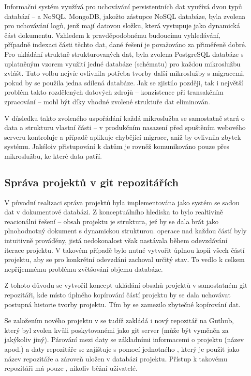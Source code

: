 Informační systém využívá pro uchovávání persistentních dat využívá dvou typů databází –  a NoSQL\@.
MongoDB, jakožto zástupce NoSQL databáze, byla zvolena pro uchovávání logů, jenž mají datovou složku, která vystupuje jako dynamická část dokumentu.
Vzhledem k pravděpodobnému budoucímu vyhledávání, případně indexaci části těchto dat, dané řešení je považováno za přiměřeně dobré.
Pro ukládání struktně strukturovaných dat, byla zvolena PostgreSQL databáze s uplatněným vzorem využití jedné databáze (schématu) pro každou mikroslužbu zvlášt.
Tuto volbu nejvíc ovlivnila potřeba tvorby další mikroslužby s migracemi, pokud by se použila jedna sdílená databáze.
Jak se zjistilo později, tak i největší problém takto rozdělených datových zdrojů – konzistence při transakčním zpracování – mohl být díky vhodné zvolené struktuře dat eliminován.

V důsledku takto zvoleného uspořádání každá mikroslužba se samostatně stará o data a strukturu vlastní části – v produkčním nasazení před spuštěním webového serveru kontroluje a případě aplikuje chybějící migrace, aniž by ovlivnila zbytek systému.
Jakéloiv přistupování k datům je rovněž komunikováno pouze přes mikroslužbu, ke které data patří.



\subsection{Správa projektů v git repozitářích}\label{subsec:server-db-github}

V původní realizaci  správa projektů byla implementována jako systém se sadou dat v dokumentové databázi.
Z konceptuálního hlediska to bylo realtivině reacionální řešení – obsah projektu je  struktura, jež by se dala brát jako plnohodnotný dokument s dynamickou strukturou.
 operace nad každou částí byly intuitivně prováděny, jistá nedokonalost však nastávala během odevzdávání iterace projektu.
V takovém případě bylo nutné vytvořit úplnou kopii všech částí projektu, aby se pro konkrétní odevzdání zachoval určitý stav.
To vedlo k celkem nepříjemnému problému zvětšování objemu databáze.

Z tohoto důvodu se vytvořil koncept ukládání obsahů projektů v samostatném git repozitáři, kde místo úplného kopírování částí projektu by se dala uchovávat postupná historie tvorby projektu.
Tím by se zamezilo zbytečné kopírování dat.

Se založením nového projektu v  se tudíž zakládá i nový repozitář na Guthub, který byl zvolen kvůli poskytovanémi  jako git server (může být vyměněn za jakýkoliv jiný).
Párování mezi daty se základními informacemi o projektu (název apod.) a daty repozitáře se zajištuje s pomocí jednotného , který je použit jako název repozitáře a zároveň uložen v databázi projektu.
Přístup k takovému repozitáři má pouze , nikoliv běžní uživatelé.

